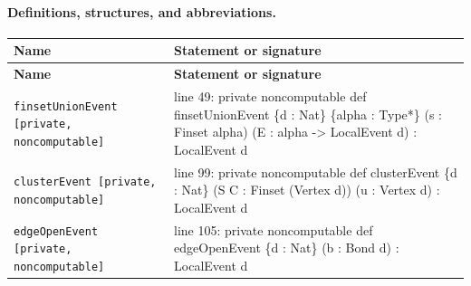 \documentclass[10pt]{article}
\begin{document}
\paragraph{Definitions, structures, and abbreviations.}
\begin{longtable}{>{\raggedright\arraybackslash}p{} >{\raggedright\arraybackslash}p{}}
\textbf{Name} & \textbf{Statement or signature} \\
\hline
\endfirsthead
\textbf{Name} & \textbf{Statement or signature} \\
\hline
\endhead
\texttt{finsetUnionEvent [private,\allowbreak{} noncomputable]} & {\ttfamily\scriptsize line 49:\allowbreak{} private noncomputable def finsetUnionEvent \{d :\allowbreak{} Nat\} \{alpha :\allowbreak{} Type*\allowbreak{}\} (\allowbreak{}s :\allowbreak{} Finset alpha)\allowbreak{} (\allowbreak{}E :\allowbreak{} alpha -\allowbreak{}> LocalEvent d)\allowbreak{} :\allowbreak{} LocalEvent d} \\[0.45em]
\texttt{clusterEvent [private,\allowbreak{} noncomputable]} & {\ttfamily\scriptsize line 99:\allowbreak{} private noncomputable def clusterEvent \{d :\allowbreak{} Nat\} (\allowbreak{}S C :\allowbreak{} Finset (\allowbreak{}Vertex d)\allowbreak{})\allowbreak{} (\allowbreak{}u :\allowbreak{} Vertex d)\allowbreak{} :\allowbreak{} LocalEvent d} \\[0.45em]
\texttt{edgeOpenEvent [private,\allowbreak{} noncomputable]} & {\ttfamily\scriptsize line 105:\allowbreak{} private noncomputable def edgeOpenEvent \{d :\allowbreak{} Nat\} (\allowbreak{}b :\allowbreak{} Bond d)\allowbreak{} :\allowbreak{} LocalEvent d} \\[0.45em]
\end{longtable}
\end{document}
